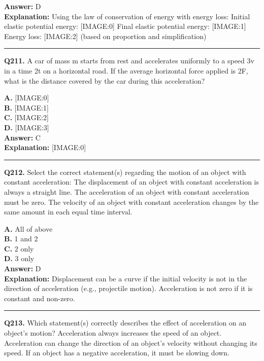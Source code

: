 \documentclass[12pt]{article}
\begin{document}
\textbf{Answer:} D \\
\textbf{Explanation:} Using the law of conservation of energy with energy loss:
Initial elastic potential energy:
[IMAGE:0]
Final elastic potential energy:
[IMAGE:1]
Energy loss:
[IMAGE:2]
(based on proportion and simplification)

\hrule
\vspace{1em}


\noindent
\textbf{Q211.} A car of mass m starts from rest and accelerates uniformly to a speed 3v in a time 2t on a horizontal road. If the average horizontal force applied is 2F, what is the distance covered by the car during this acceleration?



\textbf{A.} [IMAGE:0] \\
\textbf{B.} [IMAGE:1] \\
\textbf{C.} [IMAGE:2] \\
\textbf{D.} [IMAGE:3] \\

\textbf{Answer:} C \\
\textbf{Explanation:} [IMAGE:0]

\hrule
\vspace{1em}


\noindent
\textbf{Q212.} Select the correct statement(s) regarding the motion of an object with constant acceleration:
The displacement of an object with constant acceleration is always a straight line.
The acceleration of an object with constant acceleration must be zero.
The velocity of an object with constant acceleration changes by the same amount in each equal time interval.



\textbf{A.} All of above \\
\textbf{B.} 1 and 2 \\
\textbf{C.} 2 only \\
\textbf{D.} 3 only \\

\textbf{Answer:} D \\
\textbf{Explanation:} Displacement can be a curve if the initial velocity is not in the direction of acceleration (e.g., projectile motion). Acceleration is not zero if it is constant and non-zero.

\hrule
\vspace{1em}


\noindent
\textbf{Q213.} Which statement(s) correctly describes the effect of acceleration on an object's motion?
Acceleration always increases the speed of an object.
Acceleration can change the direction of an object's velocity without changing its speed.
If an object has a negative acceleration, it must be slowing down.
\end{document}
